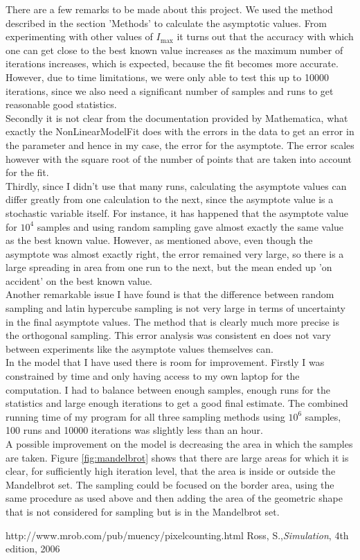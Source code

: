 \documentclass[10pt,a4paper]{article}
\begin{document}
\noindent There are a few remarks to be made about this project. We used the method described in the section 'Methods' to calculate the asymptotic values. From experimenting with other values of $I_{\text{max}}$ it turns out that the accuracy with which one can get close to the best known value increases as the maximum number of iterations increases, which is expected, because the fit becomes more accurate. However, due to time limitations, we were only able to test this up to 10000 iterations, since we also need a significant number of samples and runs to get reasonable good statistics. \\
Secondly it is not clear from the documentation provided by Mathematica, what exactly the NonLinearModelFit does with the errors in the data to get an error in the parameter and hence in my case, the error for the asymptote. The error scales however with the square root of the number of points that are taken into account for the fit.\\
Thirdly, since I didn't use that many runs, calculating the asymptote values can differ greatly from one calculation to the next, since the asymptote value is a stochastic variable itself. For instance, it has happened that the asymptote value for $10^4$ samples and using random sampling gave almost exactly the same value as the best known value. However, as mentioned above, even though the asymptote was almost exactly right, the error remained very large, so there is a large spreading in area from one run to the next, but the mean ended up 'on accident' on the best known value.\\
Another remarkable issue I have found is that the difference between random sampling and latin hypercube sampling is not very large in terms of uncertainty in the final asymptote values. The method that is clearly much more precise is the orthogonal sampling. This error analysis was consistent en does not vary between experiments like the asymptote values themselves can.\\

\noindent In the model that I have used there is room for improvement. Firstly I was constrained by time and only having access to my own laptop for the computation. I had to balance between enough samples, enough runs for the statistics and large enough iterations to get a good final estimate. The combined running time of my program for all three sampling methods using $10^6$ samples, 100 runs and 10000 iterations was slightly less than an hour.\\
A possible improvement on the model is decreasing the area in which the samples are taken. Figure \ref{fig:mandelbrot} shows that there are large areas for which it is clear, for sufficiently high iteration level, that the area is inside or outside the Mandelbrot set. The sampling could be focused on the border area, using the same procedure as used above and then adding the area of the geometric shape that is not considered for sampling but is in the Mandelbrot set.

\begin{thebibliography}{2}
  http://www.mrob.com/pub/muency/pixelcounting.html
  Ross, S.,\emph{Simulation}, 4th edition, 2006
\end{thebibliography}
\end{document}

